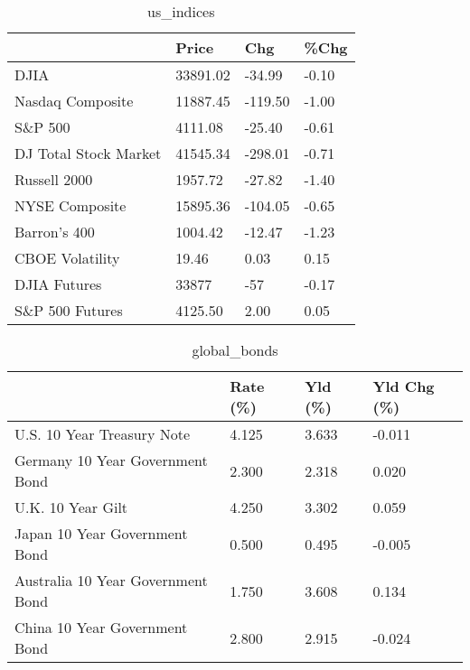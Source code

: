 \documentclass{article}%
\begin{document}
%


\begin{table}[htbp]%
\caption{us\_indices}%
\centering%
\begin{adjustbox}{width=1\textwidth}%
\begin{tabular}{llll}
\toprule
                      &    Price &     Chg &  \%Chg \\
\midrule
                 DJIA & 33891.02 &  -34.99 & -0.10 \\
     Nasdaq Composite & 11887.45 & -119.50 & -1.00 \\
              S\&P 500 &  4111.08 &  -25.40 & -0.61 \\
DJ Total Stock Market & 41545.34 & -298.01 & -0.71 \\
         Russell 2000 &  1957.72 &  -27.82 & -1.40 \\
       NYSE Composite & 15895.36 & -104.05 & -0.65 \\
         Barron's 400 &  1004.42 &  -12.47 & -1.23 \\
      CBOE Volatility &    19.46 &    0.03 &  0.15 \\
         DJIA Futures &    33877 &     -57 & -0.17 \\
      S\&P 500 Futures &  4125.50 &    2.00 &  0.05 \\
\bottomrule
\end{tabular}
%
\end{adjustbox}%
\end{table}

%


\begin{table}[htbp]%
\caption{global\_bonds}%
\centering%
\begin{adjustbox}{width=1\textwidth}%
\begin{tabular}{llll}
\toprule
                                  & Rate (\%) & Yld (\%) & Yld Chg (\%) \\
\midrule
       U.S. 10 Year Treasury Note &    4.125 &   3.633 &      -0.011 \\
  Germany 10 Year Government Bond &    2.300 &   2.318 &       0.020 \\
                U.K. 10 Year Gilt &    4.250 &   3.302 &       0.059 \\
    Japan 10 Year Government Bond &    0.500 &   0.495 &      -0.005 \\
Australia 10 Year Government Bond &    1.750 &   3.608 &       0.134 \\
    China 10 Year Government Bond &    2.800 &   2.915 &      -0.024 \\
\bottomrule
\end{tabular}
%
\end{adjustbox}%
\end{table}
\end{document}
